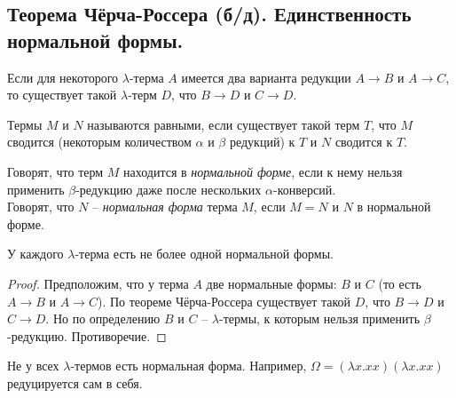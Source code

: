 \subsection{Теорема Чёрча-Россера (б/д). Единственность нормальной формы.}

\begin{theorem}
    Если для некоторого $\lambda$-терма $A$ имеется два варианта редукции $A \rightarrow B$ и $A \rightarrow C$, то существует такой $\lambda$-терм $D$, что $B \rightarrow D$ и $C \rightarrow D$.
\end{theorem}

\begin{definition}
    Термы $M$ и $N$ называются равными, если существует такой терм $T$, что $M$ сводится (некоторым количеством $\alpha$ и $\beta$ редукций) к $T$ и $N$ сводится к $T$.
\end{definition}

\begin{definition}
    Говорят, что терм $M$ находится в \textit{нормальной форме}, если к нему нельзя применить $\beta$-редукцию даже после нескольких $\alpha$-конверсий.\\
    Говорят, что $N$ -- \textit{нормальная форма} терма $M$, если $M=N$ и $N$ в нормальной форме.
\end{definition}

\begin{corollary}
    У каждого $\lambda$-терма есть не более одной нормальной формы.
    
    \begin{proof}
        Предположим, что у терма $A$ две нормальные формы: $B$ и $C$ (то есть $A \rightarrow B$ и $A \rightarrow C$). По теореме Чёрча-Россера существует такой $D$, что $B \rightarrow D$ и $C \rightarrow D$. Но по определению $B$ и $C$ -- $\lambda$-термы, к которым нельзя применить $\beta$-редукцию. Противоречие.
    \end{proof}
    
\end{corollary}

\begin{note}
    Не у всех $\lambda$-термов есть нормальная форма. Например, $\Omega = (\lambda x.xx)(\lambda x.xx)$ редуцируется сам в себя.
\end{note}